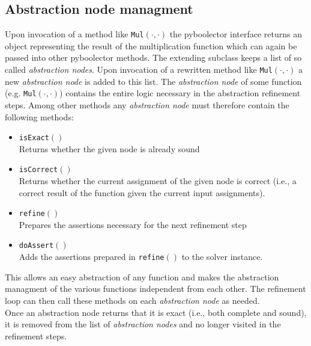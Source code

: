 \subsection{Abstraction node managment}
Upon invocation of a method like \texttt{Mul$\left(\cdot,\cdot\right)$} the pyboolector interface returns an object representing the result of the
multiplication function which can again be passed into other pyboolector methods.
The extending subclass keeps a list of so called \textit{abstraction nodes}. Upon invocation of a rewritten method like \texttt{Mul$\left(\cdot,\cdot\right)$} a new \textit{abstraction node}
is added to this list. The \textit{abstraction node} of some function (e.g. \texttt{Mul$\left(\cdot,\cdot\right)$}) contains the entire logic necessary in the abstraction refinement steps.
Among other methods any \textit{abstraction node} must therefore contain the following methods:
\begin{itemize}
    \item \texttt{isExact$\left(\right)$}\\
    Returns whether the given node is already sound
    \item \texttt{isCorrect$\left(\right)$}\\
    Returns whether the current assignment of the given node is correct (i.e., a correct result of the function given the current input assignments).
    \item \texttt{refine$\left(\right)$}\\
    Prepares the assertions necessary for the next refinement step
    \item \texttt{doAssert$\left(\right)$}\\
    Adds the assertions prepared in \texttt{refine$\left(\right)$} to the solver instance.
\end{itemize}
This allows an easy abstraction of any function and makes the abstraction managment of the various functions independent from each other.
The refinement loop can then call these methods on each \textit{abstraction node} as needed.\\
Once an abstraction node returns that it is exact (i.e., both complete and sound), it is removed from the list of \textit{abstraction nodes} and no longer visited in the refinement steps.

